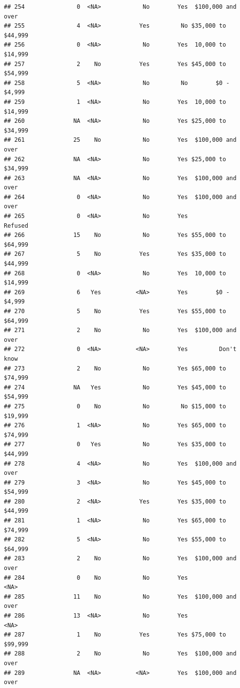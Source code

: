 \documentclass[man]{apa6}
\begin{document}
\begin{verbatim}
## 254               0  <NA>            No        Yes  $100,000 and over
## 255               4  <NA>           Yes         No $35,000 to $44,999
## 256               0  <NA>            No        Yes  10,000 to $14,999
## 257               2    No           Yes        Yes $45,000 to $54,999
## 258               5  <NA>            No         No        $0 - $4,999
## 259               1  <NA>            No        Yes  10,000 to $14,999
## 260              NA  <NA>            No        Yes $25,000 to $34,999
## 261              25    No            No        Yes  $100,000 and over
## 262              NA  <NA>            No        Yes $25,000 to $34,999
## 263              NA  <NA>            No        Yes  $100,000 and over
## 264               0  <NA>            No        Yes  $100,000 and over
## 265               0  <NA>            No        Yes            Refused
## 266              15    No            No        Yes $55,000 to $64,999
## 267               5    No           Yes        Yes $35,000 to $44,999
## 268               0  <NA>            No        Yes  10,000 to $14,999
## 269               6   Yes          <NA>        Yes        $0 - $4,999
## 270               5    No           Yes        Yes $55,000 to $64,999
## 271               2    No            No        Yes  $100,000 and over
## 272               0  <NA>          <NA>        Yes         Don't know
## 273               2    No            No        Yes $65,000 to $74,999
## 274              NA   Yes            No        Yes $45,000 to $54,999
## 275               0    No            No         No $15,000 to $19,999
## 276               1  <NA>            No        Yes $65,000 to $74,999
## 277               0   Yes            No        Yes $35,000 to $44,999
## 278               4  <NA>            No        Yes  $100,000 and over
## 279               3  <NA>            No        Yes $45,000 to $54,999
## 280               2  <NA>           Yes        Yes $35,000 to $44,999
## 281               1  <NA>            No        Yes $65,000 to $74,999
## 282               5  <NA>            No        Yes $55,000 to $64,999
## 283               2    No            No        Yes  $100,000 and over
## 284               0    No            No        Yes               <NA>
## 285              11    No            No        Yes  $100,000 and over
## 286              13  <NA>            No        Yes               <NA>
## 287               1    No           Yes        Yes $75,000 to $99,999
## 288               2    No            No        Yes  $100,000 and over
## 289              NA  <NA>          <NA>        Yes  $100,000 and over

\end{verbatim}
\end{document}
